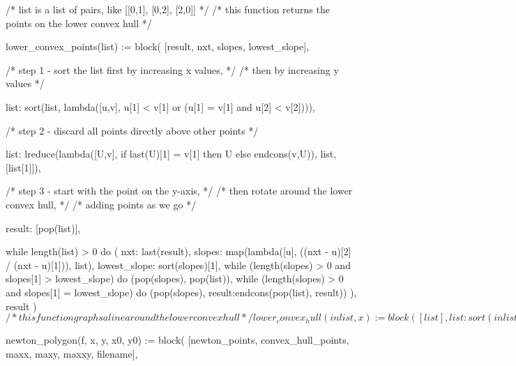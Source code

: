 
\begin{maximablocksmall}
/* list is a list of pairs, like [[0,1], [0,2], [2,0]] */
/* this function returns the points on the lower convex hull */

lower_convex_points(list) := block(
   [result, nxt, slopes, lowest_slope],

   /* step 1 - sort the list first by increasing x values, */
   /*    then by increasing y values */

   list: sort(list, lambda([u,v],
      u[1] < v[1] or (u[1] = v[1] and u[2] < v[2]))),

   /* step 2 - discard all points directly above other points */

   list: lreduce(lambda([U,v],
        if last(U)[1] = v[1] then U else endcons(v,U)),
      list, [list[1]]),

   /* step 3 - start with the point on the y-axis, */
   /*    then rotate around the lower convex hull, */
   /*    adding points as we go */

   result: [pop(list)],

   while length(list) > 0 do (
      nxt: last(result),
      slopes: map(lambda([u],
         ((nxt - u)[2] / (nxt - u)[1])), list),
      lowest_slope: sort(slopes)[1],
      while (length(slopes) > 0 and slopes[1] > lowest_slope) do
         (pop(slopes), pop(list)),
      while (length(slopes) > 0 and slopes[1] = lowest_slope) do
         (pop(slopes), result:endcons(pop(list), result))
   ),
   result
)$

/* this function graphs a line around the lower convex hull */

lower_convex_hull(inlist, x) := block([list],
  list: sort(inlist, lambda([u,v], u[1] < v[1])),
  while length(list) >= 2 and list[2][1] < x do pop(list),
  if length(list) >= 2 then
     list[1][2] + (x - list[1][1])
                  * (list[2][2] - list[1][2])
                  / (list[2][1] - list[1][1])
  else
)$

newton_polygon(f, x, y, x0, y0) := block(
   [newton_points, convex_hull_points, maxx, maxy, maxxy, filename],


\end{maximablocksmall}
